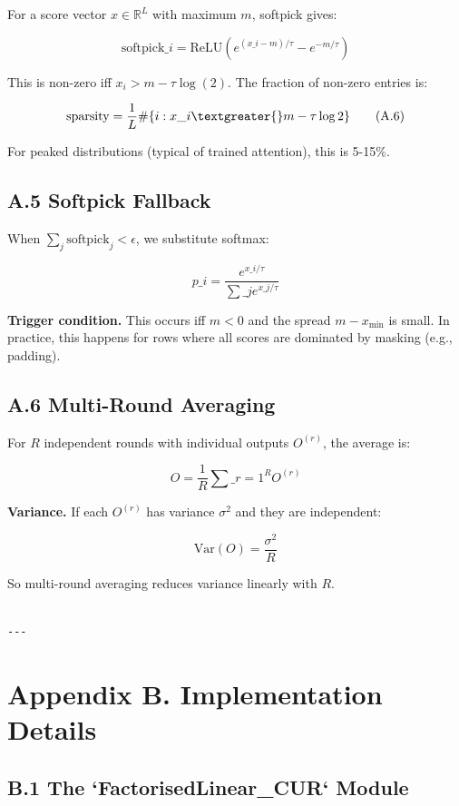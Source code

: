For a score vector $x \in \mathbb{R}^L$ with maximum $m$, softpick gives:

\[
\text{softpick}\_i = \text{ReLU}(e^{(x\_i - m)/\tau} - e^{-m/\tau})
\tag{A.5}
\]

This is non-zero iff $x_i > m - \tau \log(2)$. The fraction of non-zero 
entries is:

\[
\text{sparsity} = \frac{1}{L} \#\{i : x\_i \textgreater{} m - \tau \log 2\}
\tag{A.6}
\]

For peaked distributions (typical of trained attention), this is 5-15\%.

\subsection{A.5 Softpick Fallback}

When $\sum_j \text{softpick}_j < \epsilon$, we substitute softmax:

\[
p\_i = \frac{e^{x\_i / \tau}}{\sum\_j e^{x\_j / \tau}}
\tag{A.7}
\]

\textbf{Trigger condition.} This occurs iff $m < 0$ and the spread 
$m - x_\text{min}$ is small. In practice, this happens for rows where all 
scores are dominated by masking (e.g., padding).

\subsection{A.6 Multi-Round Averaging}

For $R$ independent rounds with individual outputs $O^{(r)}$, the average 
is:

\[
O = \frac{1}{R} \sum\_{r=1}^{R} O^{(r)}
\tag{A.8}
\]

\textbf{Variance.} If each $O^{(r)}$ has variance $\sigma^2$ and they are 
independent:

\[
\mathrm{Var}(O) = \frac{\sigma^2}{R}
\tag{A.9}
\]

So multi-round averaging reduces variance linearly with $R$.
\begin{lstlisting}

---
\end{lstlisting}


\section{Appendix B. Implementation Details}

\subsection{B.1 The `FactorisedLinear\_CUR` Module}

